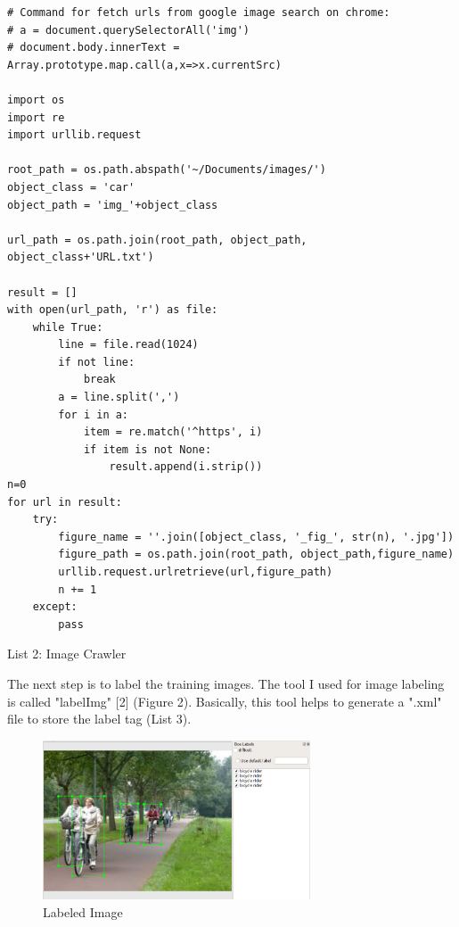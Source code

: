\documentclass[titlepage]{article}
\begin{document}
\begin{listing}
\begin{verbatim}
# Command for fetch urls from google image search on chrome:
# a = document.querySelectorAll('img')
# document.body.innerText = Array.prototype.map.call(a,x=>x.currentSrc)

import os
import re
import urllib.request

root_path = os.path.abspath('~/Documents/images/')
object_class = 'car'
object_path = 'img_'+object_class

url_path = os.path.join(root_path, object_path, object_class+'URL.txt')

result = []
with open(url_path, 'r') as file:
    while True:
        line = file.read(1024)
        if not line:
            break
        a = line.split(',')
        for i in a:
            item = re.match('^https', i)
            if item is not None:
                result.append(i.strip())
n=0
for url in result:
    try:
        figure_name = ''.join([object_class, '_fig_', str(n), '.jpg'])
        figure_path = os.path.join(root_path, object_path,figure_name)
        urllib.request.urlretrieve(url,figure_path)
        n += 1
    except:
        pass
\end{verbatim}
\centering
\caption{List 2: Image Crawler}
\newline
\end{listing}

The next step is to label the training images. The tool I used for image
labeling is called "labelImg" [2] (Figure 2). Basically, this tool helps to
generate a ".xml" file to store the label tag (List 3).

\begin{figure}[htbp]
\centering
\includegraphics[width=300]{img_labeling.png}
\caption{Labeled Image}
\end{figure}
\end{document}
